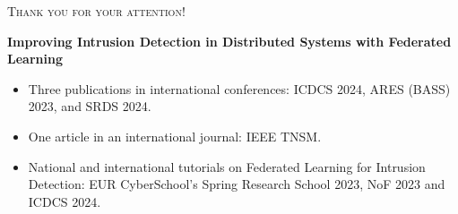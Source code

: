 






\begin{frame}
  \centering
  \scshape\Large Thank you for your attention!

  \vfill
  
  \normalshape\normalsize

  \textbf{Improving Intrusion Detection in Distributed Systems with Federated Learning}
  
  \bigskip
  \raggedright
  \begin{itemize}
    \item Three publications in international \alert{conferences}: ICDCS 2024, ARES (BASS) 2023, and SRDS 2024.
    \item One article in an international \alert{journal}: IEEE TNSM.
    \item National and international \alert{tutorials} on Federated Learning for Intrusion Detection: EUR CyberSchool's Spring Research School 2023, NoF 2023 and ICDCS 2024.
  \end{itemize}

  \vfill

\end{frame}
